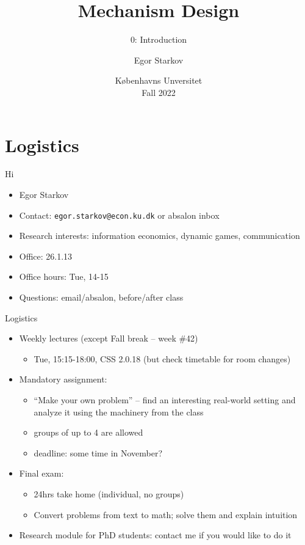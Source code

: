 \documentclass[english,10pt
,aspectratio=169
]{beamer}
\title{Mechanism Design}
\subtitle{0: Introduction}
\author{Egor Starkov}
\date{K{\o}benhavns Unversitet \\
	Fall 2022}
\begin{document}
	\frame[plain]{\titlepage}






\section{Logistics}

\begin{frame}{Hi}
	\begin{itemize}
		\item Egor Starkov
		\item Contact: \texttt{egor.starkov@econ.ku.dk} or absalon inbox
		\item Research interests: information economics, dynamic games, communication
		\item Office: 26.1.13
		\item Office hours: Tue, 14-15
		\item Questions: email/absalon, before/after class
	\end{itemize}
\end{frame}


\begin{frame}{Logistics}
	\begin{itemize}
		\item Weekly lectures (except Fall break -- week \#42)
		\begin{itemize}
			\item Tue, 15:15-18:00, CSS 2.0.18 (but check timetable for room changes)
		\end{itemize}
		
		\pause
		\item Mandatory assignment:
		\begin{itemize}
			\item ``Make your own problem'' -- find an interesting real-world setting and analyze it using the machinery from the class
			\item groups of up to 4 are allowed
			\item deadline: some time in November?
		\end{itemize}
		
		\pause
		\item Final exam:
		\begin{itemize}
			\item 24hrs take home (individual, no groups)
			\item Convert problems from text to math; solve them and explain intuition
		\end{itemize}
		
		\pause
		\item Research module for PhD students: contact me if you would like to do it
	\end{itemize}
\end{frame}
\end{document}
